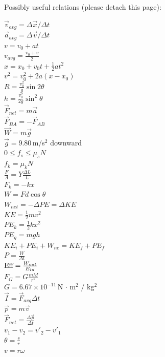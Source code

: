 \documentclass[letterpaper,addpoints,answers]{exam}
\begin{document}
\pagebreak
 
 {\Large Possibly useful relations (please detach this page):}
  
 \fontseries{\seriesdefault}
 \begin{multicols}{2}
 \normalsize
 \noindent
 $\vec{v}_{avg} = \Delta\vec{x} / \Delta t$ \\
 $\vec{a}_{avg} = \Delta\vec{v} / \Delta t$ \\
 $v = v_0 + a t$ \\
 $v_{avg} = \frac{v_0 + v}{2}$ \\
 $x = x_0 + v_0 t + \frac{1}{2} a t^2$ \\
 $v^2 = v_0^2 + 2 a (x - x_0)$ \\
 $R = \frac{v_0^2}{g}\sin 2\theta$ \\
 $h = \frac{v_0^2}{2 g} \sin^2 \theta$ \\
 $\vec{F}_{net} = m \vec{a}$ \\
 $\vec{F}_{BA} = - \vec{F}_{AB}$ \\
 $\vec{W} = m \vec{g}$ \\
 $\vec{g} = 9.80\,$m/s$^2$ downward \\
 $0 \le f_s \le \mu_s N$ \\
 $f_k = \mu_k N$ \\
 $\frac{F}{A} = Y \frac{\Delta L}{L}$ \\
 $F_k = -k x$ \\
 $W = F d \cos\theta$ \\
 $W_{net} = -\Delta PE = \Delta KE$ \\
 $KE = \frac{1}{2} m v^2$ \\
 $PE_k = \frac{1}{2} k x^2$ \\
 $PE_g = m g h$ \\
 $KE_i + PE_i + W_{nc} = KE_f + PE_f$ \\
 $P = \frac{W}{\Delta t}$ \\
 $\hbox{Eff} = \frac{W_{out}}{E_{in}}$ \\
 $F_G = G \frac{m M}{r^2}$ \\
 $G = 6.67 \times 10^{-11}\,$N $\cdot$ m$^2$ / kg$^2$ \\
 $\vec{I} = \vec{F}_{avg} \Delta t$ \\
 $\vec{p} = m \vec{v}$ \\
 $\vec{F}_{net} = \frac{\Delta \vec{p}}{\Delta t}$ \\
 $v_1 - v_2 = v'_2 - v'_1$ \\
 $\theta = \frac{s}{r}$ \\
 $v = r \omega$ \\

\end{multicols}
\end{document}
